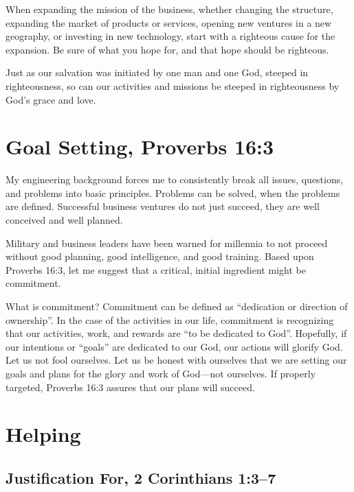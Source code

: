 \documentclass[12pt]{memoir}
\begin{document}
When expanding the mission of the business, whether changing the structure,
expanding the market of products or services, opening new ventures
in a new geography, or investing in new technology, start with a righteous
cause for the expansion. Be sure of what you hope for, and that hope
should be righteous.

Just as our salvation was initiated by one man and one God, steeped in righteousness, so can our activities and missions be steeped in righteousness by God's grace and love.


\section[Goal Setting]{Goal Setting, Proverbs 16:3}

My engineering background forces me to consistently break all issues, questions, and problems into basic principles.
Problems can be solved, when the problems are defined.
Successful business ventures do not just succeed, they are well conceived and well planned.

Military and business leaders have been warned for millennia to not proceed without good planning, good intelligence, and good training.
Based upon Proverbs 16:3, let me suggest that a critical, initial ingredient might be commitment.

What is commitment? Commitment can be defined as ``dedication or direction of ownership''.
In the case of the activities in our life, commitment is recognizing
that our activities, work, and rewards are ``to be dedicated to God''.
Hopefully, if our intentions or ``goals'' are dedicated to our God,
our actions will glorify God. Let us not fool ourselves. Let us be
honest with ourselves that we are setting our goals and plans for
the glory and work of God---not ourselves. If properly targeted,
Proverbs 16:3 assures that our plans will succeed.

\section{Helping}
\subsection[Justification For]{Justification For, 2 Corinthians 1:3--7}
\end{document}
